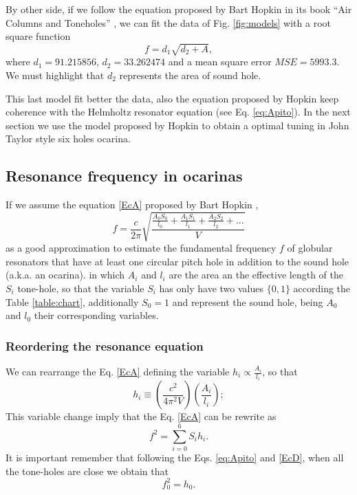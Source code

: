 \documentclass[11pt,twocolumn]{article}
\begin{document}
By other side, 
if we follow the equation proposed by Bart Hopkin in its book ``Air Columns and Toneholes'' 
\cite[pp. 44]{cabreraestudio} \cite{1999air},
we can fit the data of Fig. \ref{fig:models} with a root square function
\begin{equation}
f=d_1\sqrt{d_2+A},
\end{equation}
where $d_1=91.215856$, $d_2=33.262474$ and a mean square error $MSE=5993.3$.
We must highlight that $d_2$ represents the area of sound hole. 

This last model fit better the data, 
also the equation proposed by Hopkin keep coherence with the Helmholtz resonator equation (see Eq. \ref{eq:Apito}).
In the next section we use the model proposed by Hopkin to obtain a optimal tuning in 
John Taylor style six holes ocarina.


\subsection{Resonance frequency in ocarinas}


If we assume the equation \ref{EcA} proposed by Bart Hopkin \cite[pp. 44]{cabreraestudio} \cite{1999air},
\begin{equation} \label{EcA}
 f = \frac{c}{2 \pi} \sqrt{\frac{\frac{A_{0}S_{0}}{l_{0}}+\frac{A_{1}S_{1}}{l_{1}}+\frac{A_{2}S_{2}}{l_{2}}+ . . .}{V} }   
\end{equation}
as a good approximation to estimate the fundamental frequency $f$ 
of globular resonators that have at least one circular pitch hole in addition to the sound hole (a.k.a. an ocarina). 
in which $A_i$ and $l_i$ are the area an the effective length of the $S_i$ tone-hole,
so that the variable $S_i$ has only have two values $\{0,1\}$ according the Table \ref{table:chart},
additionally $S_0=1$ and represent the sound hole, being $A_0$ and $l_0$ their corresponding variables. 



\subsubsection{Reordering the resonance equation}
We can rearrange the Eq. \ref{EcA} defining the variable $h_{i}\propto \frac{A_{i}}{l_{i}}$, so that
\begin{equation} \label{EcC}
 h_{i} \equiv  \left( \frac{c^2}{4 {\pi}^2 V}\right) \left( \frac{A_{i}}{l_{i}}    \right);
\end{equation}
This variable change imply that the Eq. \ref{EcA} can be rewrite as
\begin{equation} \label{EcD}
 f^{2} = \sum_{i=0}^{6}{S_i h_i}.
\end{equation}
It is important remember that following the Eqs. \ref{eq:Apito} and \ref{EcD},
when all the tone-holes are close we obtain that 
\begin{equation} \label{EcDa}
f_0^{2} = h_0.
\end{equation} 
\end{document}
